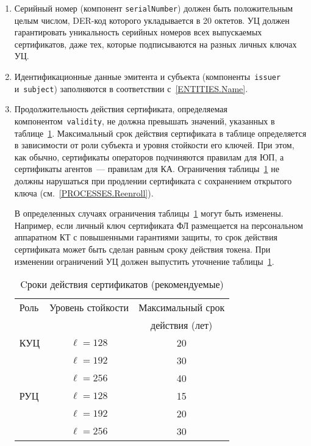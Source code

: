 \begin{enumerate}
\item
Серийный номер (компонент \texttt{serialNumber}) 
должен быть положительным целым 
числом, DER-код которого укладывается в 20 октетов.
%
УЦ должен гарантировать уникальность серийных 
номеров всех выпускаемых сертификатов, даже тех, которые 
подписываются на разных личных ключах УЦ.

\item
Идентификационные данные эмитента и субъекта (компоненты~\texttt{issuer} 
и~\texttt{subject}) заполняются в соответствии с~\ref{ENTITIES.Name}.

\item
Продолжительность действия сертификата, определяемая 
компонентом~\texttt{validity}, не должна превышать значений,
указанных в таблице~\ref{Table.CERT.Validity}.
%
Максимальный срок действия сертификата в таблице определяется в 
зависимости от роли субъекта и уровня стойкости его ключей.  
%
При этом, как обычно, сертификаты операторов подчиняются правилам для ЮП, 
а сертификаты агентов~--- правилам для КА.
%
Ограничения таблицы~\ref{Table.CERT.Validity} не должны нарушаться  
при продлении сертификата с сохранением открытого ключа 
(см.~\ref{PROCESSES.Reenroll}).

В определенных случаях ограничения таблицы~\ref{Table.CERT.Validity}
могут быть изменены. Например, если личный ключ сертификата ФЛ размещается на 
персональном аппаратном КТ с повышенными гарантиями защиты, то срок действия 
сертификата может быть сделан равным сроку действия токена. При изменении 
ограничений УЦ должен выпустить уточнение таблицы~\ref{Table.CERT.Validity}. 

\begin{table}[bht]
\caption{Cроки действия сертификатов (рекомендуемые)}
\label{Table.CERT.Validity}
\begin{tabular}{|l|c|c|}
\hline
Роль  & Уровень стойкости & Максимальный срок\\
      &                   & действия (лет)\\
\hline
\hline

КУЦ & $\ell=128$ & 20\\
\cline{2-3} & $\ell=192$ & 30\\
\cline{2-3} & $\ell=256$ & 40\\
\hline

РУЦ & $\ell=128$ & 15\\
\cline{2-3} & $\ell=192$ & 20\\
\cline{2-3} & $\ell=256$ & 30\\
\hline


\end{tabular}
\end{table}
\end{enumerate}
